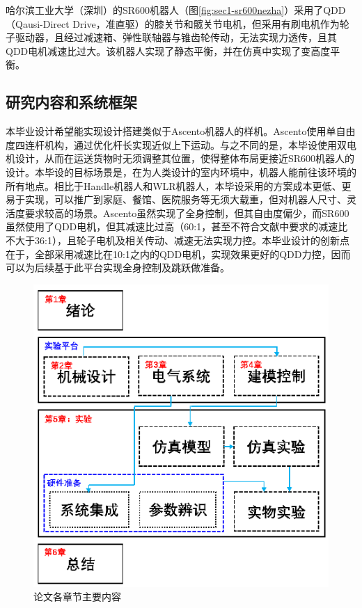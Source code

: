 哈尔滨工业大学（深圳）的SR600机器人（图\ref{fig:sec1-sr600nezha}）采用了QDD\cite{wensing2017proprioceptive}（Qausi-Direct Drive，准直驱）的膝关节和髋关节电机，但采用有刷电机作为轮子驱动器，且经过减速箱、弹性联轴器与锥齿轮传动，无法实现力透传，且其QDD电机减速比过大。该机器人实现了静态平衡\cite{zhang2019system}，并在仿真中实现了变高度平衡\cite{liu2019dynamic}。

\subsection{研究内容和系统框架}
本毕业设计希望能实现设计搭建类似于Ascento机器人的样机。Ascento使用单自由度四连杆机构，通过优化杆长实现近似上下运动。与之不同的是，本毕设使用双电机设计，从而在运送货物时无须调整其位置，使得整体布局更接近SR600机器人的设计。本毕设的目标场景是，在为人类设计的室内环境中，机器人能前往该环境的所有地点。相比于Handle机器人和WLR机器人，本毕设采用的方案成本更低、更易于实现，可以推广到家庭、餐馆、医院服务等无须大载重，但对机器人尺寸、灵活度要求较高的场景。Ascento虽然实现了全身控制\cite{klemm2020lqr}，但其自由度偏少，而SR600虽然使用了QDD电机，但其减速比过高（60:1，甚至不符合文献\cite{wensing2017proprioceptive}中要求的减速比不大于36:1），且轮子电机及相关传动、减速无法实现力控。本毕业设计的创新点在于，全部采用减速比在10:1之内的QDD电机，实现效果更好的QDD力控，因而可以为后续基于此平台实现全身控制及跳跃做准备。

\begin{figure}[t!]
  \centering
  \includegraphics[width=0.7\linewidth]{figures/Sec1/frame1.png}
  \caption{
  论文各章节主要内容
  }
  \label{fig:sec1-frame1}
   \vspace{4pt}
\end{figure}

